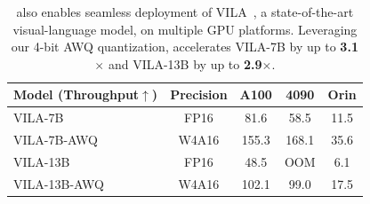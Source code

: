 \begin{table}
    \setlength{\tabcolsep}{5pt}
    \small
    \centering
    \begin{tabular}{lcccc} \toprule
\textbf{Model (Throughput$\uparrow$)}          & Precision & A100 & 4090 & Orin \\ \midrule
VILA-7B      & FP16      & 81.6              & 58.5              & 11.5              \\
VILA-7B-AWQ  & W4A16     & 155.3             & 168.1             & 35.6              \\ \midrule
VILA-13B     & FP16      & 48.5              & OOM               & 6.1               \\
VILA-13B-AWQ & W4A16     & 102.1             & 99.0              & 17.5 \\\bottomrule             
\end{tabular}
    \caption{\system also enables seamless deployment of VILA~\cite{lin2023vila}, a state-of-the-art visual-language model, on multiple GPU platforms. Leveraging our 4-bit AWQ quantization, \system accelerates VILA-7B by up to \textbf{3.1$\times$} and VILA-13B by up to \textbf{2.9$\times$}.}
    \label{tab:vila_latency}
\end{table}


